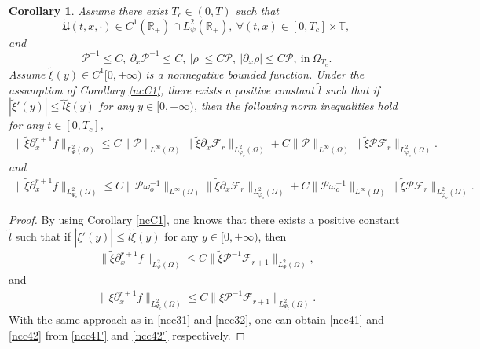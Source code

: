 \documentclass{amsart}
\numberwithin{equation}{section}
\newtheorem{corollary}{Corollary}[section]
\begin{document}
\begin{corollary}\label{ncC4}
Assume there exist $T_{c}\in(0,T)$ such that
$$\dot{\mathfrak{U}}(t,x,\cdot)\in C^{1}(\mathbb{R}_{+})\cap L_{\psi}^{2}(\mathbb{R}_{+}),~\forall (t,x)\in[0,T_{c}]\times\mathbb{T},$$
and
$$\mathcal{P}^{-1}\leq C,~\partial_{x}\mathcal{P}^{-1}\leq C,~|\rho|\leq C\mathcal{P},~|\partial_{x}\rho|\leq C\mathcal{P},~\text{in}~ \Omega_{T_{c}}.$$
Assume $\tilde{\xi}(y)\in C^{1}[0,+\infty)$ is a nonnegative bounded function. Under the assumption of Corollary \ref{ncC1}, there exists a positive constant $\tilde{l}$ such that if $|\tilde{\xi}'(y)|\leq \tilde{l}\tilde{\xi}(y)$ for any $y\in[0,+\infty)$, then the following norm inequalities hold for any $t\in[0,T_{c}]$,
\begin{align}\label{ncc41}
\|\tilde{\xi}\partial_{x}^{r+1}f\|_{L_{\Psi}^{2}(\Omega)}
\leq C\|\mathcal{P}\|_{L^{\infty}(\Omega)}\|\tilde{\xi}\partial_{x}\mathcal{F}_{r}\|_{L_{\varphi_{o}}^{2}(\Omega)}
    +C\|\mathcal{P}\|_{L^{\infty}(\Omega)}\|\tilde{\xi}\mathcal{P}\mathcal{F}_{r}\|_{L_{\varphi_{o}}^{2}(\Omega)}.
\end{align}
and
\begin{align}\label{ncc42}
\|\tilde{\xi}\partial_{x}^{r+1}f\|_{L_{\Psi_{c}}^{2}(\Omega)}
\leq C\|\mathcal{P}\omega_{o}^{-1}\|_{L^{\infty}(\Omega)}\|\tilde{\xi}\partial_{x}\mathcal{F}_{r}\|_{L_{\varphi_{o}}^{2}(\Omega)}
    +C\|\mathcal{P}\omega_{o}^{-1}\|_{L^{\infty}(\Omega)}\|\tilde{\xi}\mathcal{P}\mathcal{F}_{r}\|_{L_{\varphi_{o}}^{2}(\Omega)}.
\end{align}
\end{corollary}
\begin{proof}
By using Corollary \ref{ncC1}, one knows that there exists a positive constant $\tilde{l}$ such that if $|\tilde{\xi}'(y)|\leq \tilde{l}\tilde{\xi}(y)$ for any $y\in[0,+\infty)$, then
\begin{align}\label{ncc41'}
\|\tilde{\xi}\partial_{x}^{r+1}f\|_{L_{\Psi}^{2}(\Omega)}
\leq C\|\tilde{\xi}\mathcal{P}^{-1}\mathcal{F}_{r+1}\|_{L_{\Psi}^{2}(\Omega)},
\end{align}
and
\begin{align}\label{ncc42'}
\|\xi\partial_{x}^{r+1}f\|_{L_{\Psi_{c}}^{2}(\Omega)}
\leq C\|\xi\mathcal{P}^{-1}\mathcal{F}_{r+1}\|_{L_{\Psi_{c}}^{2}(\Omega)}.
\end{align}
With the same approach as in \eqref{ncc31} and \eqref{ncc32}, one can obtain \eqref{ncc41} and \eqref{ncc42} from \eqref{ncc41'} and \eqref{ncc42'} respectively.
\end{proof}
\end{document}

